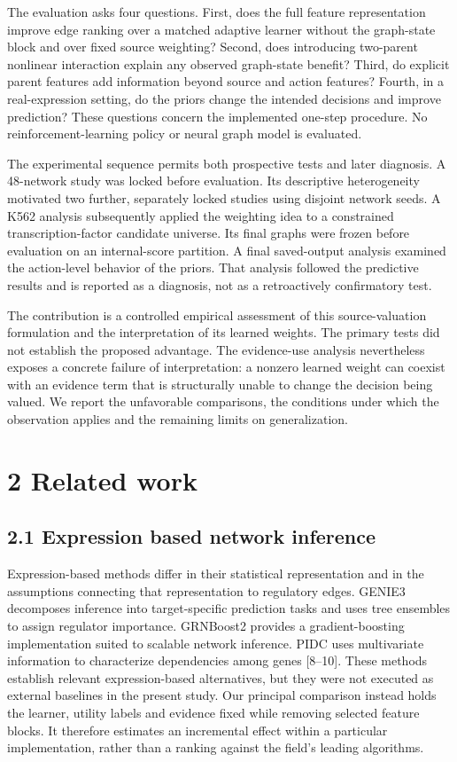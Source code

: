 \documentclass[
  11pt,
]{article}
\begin{document}
The evaluation asks four questions. First, does the full feature
representation improve edge ranking over a matched adaptive learner
without the graph-state block and over fixed source weighting? Second,
does introducing two-parent nonlinear interaction explain any observed
graph-state benefit? Third, do explicit parent features add information
beyond source and action features? Fourth, in a real-expression setting,
do the priors change the intended decisions and improve prediction?
These questions concern the implemented one-step procedure. No
reinforcement-learning policy or neural graph model is evaluated.

The experimental sequence permits both prospective tests and later
diagnosis. A 48-network study was locked before evaluation. Its
descriptive heterogeneity motivated two further, separately locked
studies using disjoint network seeds. A K562 analysis subsequently
applied the weighting idea to a constrained transcription-factor
candidate universe. Its final graphs were frozen before evaluation on an
internal-score partition. A final saved-output analysis examined the
action-level behavior of the priors. That analysis followed the
predictive results and is reported as a diagnosis, not as a
retroactively confirmatory test.

The contribution is a controlled empirical assessment of this
source-valuation formulation and the interpretation of its learned
weights. The primary tests did not establish the proposed advantage. The
evidence-use analysis nevertheless exposes a concrete failure of
interpretation: a nonzero learned weight can coexist with an evidence
term that is structurally unable to change the decision being valued. We
report the unfavorable comparisons, the conditions under which the
observation applies and the remaining limits on generalization.

\section{2 Related work}\label{related-work}

\subsection{2.1 Expression based network
inference}\label{expression-based-network-inference}

Expression-based methods differ in their statistical representation and
in the assumptions connecting that representation to regulatory edges.
GENIE3 decomposes inference into target-specific prediction tasks and
uses tree ensembles to assign regulator importance. GRNBoost2 provides a
gradient-boosting implementation suited to scalable network inference.
PIDC uses multivariate information to characterize dependencies among
genes {[}8--10{]}. These methods establish relevant expression-based
alternatives, but they were not executed as external baselines in the
present study. Our principal comparison instead holds the learner,
utility labels and evidence fixed while removing selected feature
blocks. It therefore estimates an incremental effect within a particular
implementation, rather than a ranking against the field's leading
algorithms.
\end{document}

